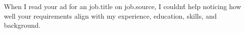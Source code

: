 When I read your ad for an {{job.title}} on {{job.source}}, I couldn\'t help noticing how well your requirements align with my experience, education, skills, and background.